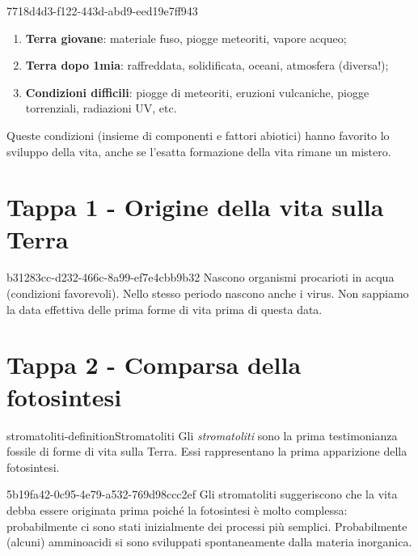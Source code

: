\documentclass[preview]{standalone}
\begin{document}
\begin{snippet}{7718d4d3-f122-443d-abd9-eed19e7ff943}
    \begin{enumerate}
        \item \textbf{Terra giovane}: materiale fuso, piogge meteoriti, vapore acqueo;
        \item \textbf{Terra dopo 1mia}: raffreddata, solidificata, oceani, atmosfera (diversa!);
        \item \textbf{Condizioni difficili}: piogge di meteoriti, eruzioni vulcaniche, piogge torrenziali, radiazioni UV, etc.
    \end{enumerate}

    Queste condizioni (insieme di componenti e fattori abiotici) hanno
    favorito lo sviluppo della vita, anche se l'esatta formazione della vita rimane un mistero.
\end{snippet}

\section{Tappa 1 - Origine della vita sulla Terra}

\begin{snippet}{b31283cc-d232-466c-8a99-ef7e4cbb9b32}
    Nascono organismi procarioti in acqua (condizioni favorevoli).
    Nello stesso periodo nascono anche i virus.
    Non sappiamo la data effettiva delle prima forme di vita prima di questa data.
\end{snippet}

\section{Tappa 2 - Comparsa della fotosintesi}

\begin{snippetdefinition}{stromatoliti-definition}{Stromatoliti}
    Gli \textit{stromatoliti} sono la prima testimonianza fossile di forme di vita sulla Terra.
    Essi rappresentano la prima apparizione della fotosintesi.
\end{snippetdefinition}

\begin{snippet}{5b19fa42-0c95-4e79-a532-769d98ccc2ef}
    Gli stromatoliti suggeriscono che la vita debba essere originata prima
    poiché la fotosintesi è molto complessa: probabilmente ci sono stati inizialmente
    dei processi più semplici.
    Probabilmente (alcuni) amminoacidi si sono sviluppati spontaneamente dalla materia
    inorganica.
\end{snippet}
\end{document}
